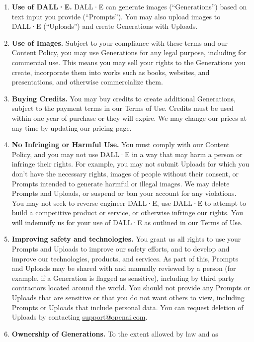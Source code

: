 \begin{enumerate}
\item \textbf{Use of DALL·E.} DALL·E can generate images (``Generations'') based
    on text input you provide (``Prompts''). You may also upload images to
    DALL·E (``Uploads'') and create Generations with Uploads.
\item \textbf{Use of Images.} Subject to your compliance with these terms and
    our Content Policy, you may use Generations for any legal purpose, including
    for commercial use. This means you may sell your rights to the Generations
    you create, incorporate them into works such as books, websites, and
    presentations, and otherwise commercialize them.
\item \textbf{Buying Credits.} You may buy credits to create additional
    Generations, subject to the payment terms in our Terms of Use. Credits must
    be used within one year of purchase or they will expire. We may change our
    prices at any time by updating our pricing page.
\item \textbf{No Infringing or Harmful Use.} You must comply with our Content
    Policy, and you may not use DALL·E in a way that may harm a person or
    infringe their rights. For example, you may not submit Uploads for which you
    don't have the necessary rights, images of people without their consent, or
    Prompts intended to generate harmful or illegal images. We may delete
    Prompts and Uploads, or suspend or ban your account for any violations. You
    may not seek to reverse engineer DALL·E, use DALL·E to attempt to build a
    competitive product or service, or otherwise infringe our rights. You will
    indemnify us for your use of DALL·E as outlined in our Terms of Use.
\item \textbf{Improving \AI{} safety and technologies.} You grant us all rights
    to use your Prompts and Uploads to improve our \AI{} safety efforts, and to
    develop and improve our \AI{} technologies, products, and services. As part
    of this, Prompts and Uploads may be shared with and manually reviewed by a
    person (for example, if a Generation is flagged as sensitive), including by
    third party contractors located around the world. You should not provide any
    Prompts or Uploads that are sensitive or that you do not want others to
    view, including Prompts or Uploads that include personal data. You can
    request deletion of Uploads by contacting \url{support@openai.com}.
\item \textbf{Ownership of Generations.} To the extent allowed by law and as

\end{enumerate}
